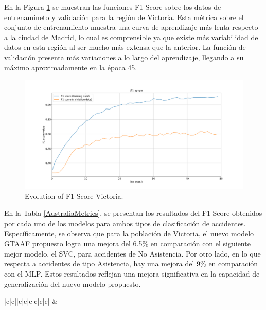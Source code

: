 \documentclass{uathesis-es}
\begin{document}
{En la Figura \ref{VictoriaLossFunction} se muestran las funciones F1-Score sobre los datos de entrenamineto y validación para la región de Victoria. Esta métrica sobre el conjunto de entrenamiento muestra una curva de aprendizaje más lenta respecto a la ciudad de Madrid, lo cual es comprensible ya que existe más variabilidad de datos en esta región al ser mucho más extensa que la anterior. La función de validación presenta más variaciones a lo largo del aprendizaje, llegando a su máximo aproximadamente en la época 45.

\begin{figure}[H]
\centering
    \includegraphics[width=160mm]{Figures/Victoria/Victoria_convolution_2d_f1_score_paper.png}
    \caption{Evolution of F1-Score Victoria.}
\label{VictoriaLossFunction}
\end{figure}

En la Tabla \ref{AustraliaMetrics}, se presentan los resultados del F1-Score obtenidos por cada uno de los modelos para ambos tipos de clasificación de accidentes. Específicamente, se observa que para la población de Victoria, el nuevo modelo GTAAF propuesto logra una mejora del 6.5\% en comparación con el siguiente mejor modelo, el SVC, para accidentes de No Asistencia. Por otro lado, en lo que respecta a accidentes de tipo Asistencia, hay una mejora del 9\% en comparación con el MLP. Estos resultados reflejan una mejora significativa en la capacidad de generalización del nuevo modelo propuesto.


\begin{table}[H]
    \begin{center}
        \begin{tabular}{|c|c||c|c|c|c|c|c|}
        \hline
         &
         \\ \hline


\end{tabular}
\end{center}
\end{table}}
\end{document}
